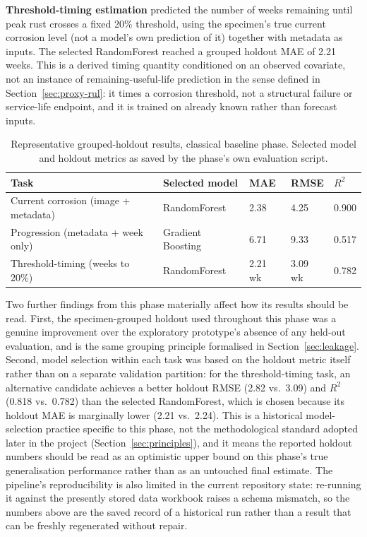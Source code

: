 \textbf{Threshold-timing estimation} predicted the number of weeks remaining
until peak rust crosses a fixed 20\% threshold, using the specimen's true
current corrosion level (not a model's own prediction of it) together with
metadata as inputs. The selected RandomForest reached a grouped holdout MAE
of 2.21 weeks. This is a derived timing quantity conditioned on an observed
covariate, not an instance of remaining-useful-life prediction in the sense
defined in Section~\ref{sec:proxy-rul}: it times a corrosion threshold, not a
structural failure or service-life endpoint, and it is trained on already
known rather than forecast inputs.

\begin{table}[htbp]
\centering
\caption{Representative grouped-holdout results, classical baseline phase.
Selected model and holdout metrics as saved by the phase's own evaluation
script.}
\label{tab:phase1-results}
\begin{tabular}{p{4.3cm}p{2.6cm}p{1.5cm}p{1.6cm}p{1.5cm}}
\toprule
Task & Selected model & MAE & RMSE & $R^2$ \\
\midrule
Current corrosion (image + metadata) & RandomForest & 2.38 & 4.25 & 0.900 \\
Progression (metadata + week only) & Gradient Boosting & 6.71 & 9.33 & 0.517 \\
Threshold-timing (weeks to 20\%) & RandomForest & 2.21 wk & 3.09 wk & 0.782 \\
\bottomrule
\end{tabular}
\end{table}

Two further findings from this phase materially affect how its results
should be read. First, the specimen-grouped holdout used throughout this
phase was a genuine improvement over the exploratory prototype's absence of
any held-out evaluation, and is the same grouping principle formalised in
Section~\ref{sec:leakage}. Second, model selection within each task was
based on the holdout metric itself rather than on a separate validation
partition: for the threshold-timing task, an alternative candidate achieves
a better holdout RMSE (2.82 vs.\ 3.09) and $R^2$ (0.818 vs.\ 0.782) than the
selected RandomForest, which is chosen because its holdout MAE is
marginally lower (2.21 vs.\ 2.24). This is a historical model-selection
practice specific to this phase, not the methodological standard adopted
later in the project (Section~\ref{sec:principles}), and it means the
reported holdout numbers should be read as an optimistic upper bound on
this phase's true generalisation performance rather than as an untouched
final estimate. The pipeline's reproducibility is also limited in the
current repository state: re-running it against the presently stored data
workbook raises a schema mismatch, so the numbers above are the saved
record of a historical run rather than a result that can be freshly
regenerated without repair.

